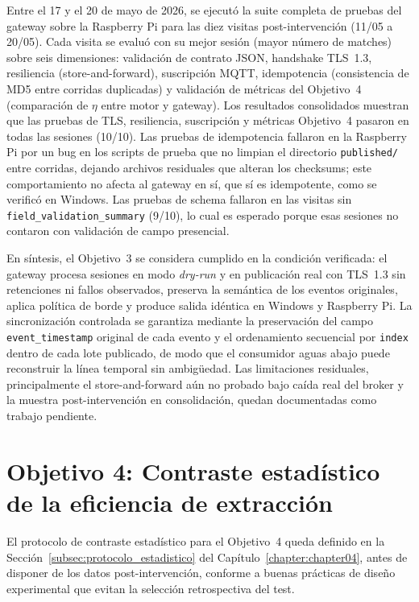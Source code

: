 Entre el 17 y el 20 de mayo de 2026, se ejecutó la suite completa de pruebas del gateway sobre la Raspberry Pi para las diez visitas post-intervención (11/05 a 20/05). Cada visita se evaluó con su mejor sesión (mayor número de matches) sobre seis dimensiones: validación de contrato JSON, handshake TLS~1.3, resiliencia (store-and-forward), suscripción MQTT, idempotencia (consistencia de MD5 entre corridas duplicadas) y validación de métricas del Objetivo~4 (comparación de $\eta$ entre motor y gateway). Los resultados consolidados muestran que las pruebas de TLS, resiliencia, suscripción y métricas Objetivo~4 pasaron en todas las sesiones (10/10). Las pruebas de idempotencia fallaron en la Raspberry Pi por un bug en los scripts de prueba que no limpian el directorio \texttt{published/} entre corridas, dejando archivos residuales que alteran los checksums; este comportamiento no afecta al gateway en sí, que sí es idempotente, como se verificó en Windows. Las pruebas de schema fallaron en las visitas sin \texttt{field\_validation\_summary} (9/10), lo cual es esperado porque esas sesiones no contaron con validación de campo presencial.

En síntesis, el Objetivo~3 se considera cumplido en la condición verificada: el gateway procesa sesiones en modo \textit{dry-run} y en publicación real con TLS~1.3 sin retenciones ni fallos observados, preserva la semántica de los eventos originales, aplica política de borde y produce salida idéntica en Windows y Raspberry Pi. La sincronización controlada se garantiza mediante la preservación del campo \texttt{event\_timestamp} original de cada evento y el ordenamiento secuencial por \texttt{index} dentro de cada lote publicado, de modo que el consumidor aguas abajo puede reconstruir la línea temporal sin ambigüedad. Las limitaciones residuales, principalmente el store-and-forward aún no probado bajo caída real del broker y la muestra post-intervención en consolidación, quedan documentadas como trabajo pendiente.

\section{Objetivo 4: Contraste estadístico de la eficiencia de extracción}
\label{sec:analisis-estadistico}

El protocolo de contraste estadístico para el Objetivo~4 queda definido en la Sección~\ref{subsec:protocolo_estadistico} del Capítulo~\ref{chapter:chapter04}, antes de disponer de los datos post-intervención, conforme a buenas prácticas de diseño experimental que evitan la selección retrospectiva del test.

